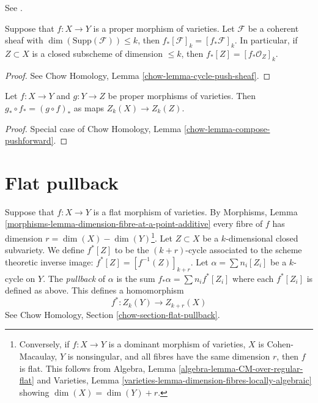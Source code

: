 \begin{lemma}
\label{lemma-push-coherent}
\begin{reference}
See \cite[Chapter V]{Serre_algebre_locale}.
\end{reference}
Suppose that $f : X \to Y$ is a proper morphism of varieties.
Let $\mathcal{F}$ be a coherent sheaf with
$\dim(\text{Supp}(\mathcal{F})) \leq k$, then
$f_*[\mathcal{F}]_k = [f_*\mathcal{F}]_k$. In particular, if
$Z \subset X$ is a closed subscheme of dimension $\leq k$, then
$f_*[Z] = [f_*\mathcal{O}_Z]_k$.
\end{lemma}

\begin{proof}
See Chow Homology, Lemma \ref{chow-lemma-cycle-push-sheaf}.
\end{proof}

\begin{lemma}
\label{lemma-compose-pushforward}
Let $f : X \to Y$ and $g : Y \to Z$ be proper morphisms of
varieties. Then $g_* \circ f_* = (g \circ f)_*$ as maps $Z_k(X) \to Z_k(Z)$.
\end{lemma}

\begin{proof}
Special case of Chow Homology, Lemma \ref{chow-lemma-compose-pushforward}.
\end{proof}



\section{Flat pullback}
\label{section-flat-pullback}

\noindent
Suppose that $f : X \to Y$ is a flat morphism of varieties.
By Morphisms, Lemma
\ref{morphisms-lemma-dimension-fibre-at-a-point-additive} 
every fibre of $f$ has dimension $r = \dim(X) - \dim(Y)$\footnote{Conversely,
if $f : X \to Y$ is a dominant morphism of varieties,
$X$ is Cohen-Macaulay, $Y$ is nonsingular, and all fibres have
the same dimension $r$, then $f$ is flat. This follows from
Algebra, Lemma \ref{algebra-lemma-CM-over-regular-flat} and
Varieties, Lemma \ref{varieties-lemma-dimension-fibres-locally-algebraic}
showing $\dim(X) = \dim(Y) + r$.}.
Let $Z \subset X$ be a $k$-dimensional closed subvariety. We define
$f^*[Z]$ to be the $(k + r)$-cycle associated to the scheme theoretic
inverse image: $f^*[Z] = [f^{-1}(Z)]_{k + r}$. Let
$\alpha = \sum n_i [Z_i]$ be a $k$-cycle on $Y$. The {\it pullback} of
$\alpha$ is the sum $f_* \alpha = \sum n_i f^*[Z_i]$ where each $f^*[Z_i]$
is defined as above. This defines a homomorphism
$$
f^* : Z_k(Y) \longrightarrow Z_{k + r}(X)
$$
See Chow Homology, Section \ref{chow-section-flat-pullback}.

